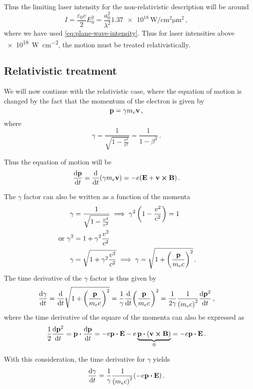 \documentclass[12pt, class=report, crop=false]{standalone}
\begin{document}
Thus the limiting laser intensity for the non-relativistic description will be around
\[
I = \frac{\varepsilon_0 c}{2} E_0^2 = \frac{a_0^2}{\lambda^2} \SI{1.37e18}{\watt\per\centi\metre\squared\micro\metre\squared}\,,
\]
where we have used \cref{eq:plane-wave-intensity}.
Thus for laser intensities above \SI{e18}{\watt\per\centi\metre\squared},
the motion must be treated relativistically.

\subsection{Relativistic treatment}

We will now continue with the relativistic case, where the equation
of motion is changed by the fact that the momentum of the electron is given by
\[
\vb{p} = \gamma m_e \vb{v}\,,
\]
where
\[
\gamma = \frac{1}{\sqrt{1-\frac{v^2}{c^2}}} = \frac{1}{1-\beta^2}\,.
\]

Thus the equation of motion will be
\begin{equation}
  \label{eq:relativistic-lorentz}
  \dv{\vb{p}}{t} = \dv{t}(\gamma m_e \vb{v}) = -e (\vb{E} + \vb{v}\cp\vb{B})\,.
\end{equation}

The \(\gamma\) factor can also be written as a function of the momenta
\[
\begin{aligned}
  \gamma &= \frac{1}{\sqrt{1-\frac{v^2}{c^2}}} \implies
  \gamma^2\left(1-\frac{v^2}{c^2}\right)=1\\ \text{ or }
  \gamma^2 &= 1+\gamma^2\frac{v^2}{c^2}\\
  \gamma &= \sqrt{1+\gamma^2\frac{v^2}{c^2}} \implies
  \gamma = \sqrt{1 + {\left(\frac{\vb{p}}{m_e c}\right)}^2}\,.
\end{aligned}
\]
The time derivative of the \(\gamma\) factor is thus given by
\[
\dv{\gamma}{t} = \dv{t}\sqrt{1+{\left(\frac{\vb{p}}{m_e c}\right)}^2} =
\frac{1}{\gamma} {\dv{t}} {\left(\frac{\vb{p}}{m_e c}\right)}^2 =
\frac{1}{2\gamma}\frac{1}{{(m_e c)}^2} \dv{\vb{p}^2}{t}\,,
\]
where the time derivative of the square of the momenta can also be expressed as
\[
\frac{1}{2}\dv{\vb{p}^2}{t} = \vb{p}\vdot\dv{\vb{p}}{t} =
-e\vb{p}\vdot\vb{E}-e\underbrace{\vb{p}\vdot(\vb{v}\cp\vb{B})}_0 =
-e\vb{p}\vdot\vb{E}\,.
\]

With this consideration, the time derivative for \(\gamma\) yields
\begin{equation}
  \label{eq:gamma-time-derivative}
  \dv{\gamma}{t} = \frac{1}{\gamma} \frac{1}{{(m_e c)}^2} (-e\vb{p}\vdot\vb{E})\,.
\end{equation}
\end{document}
